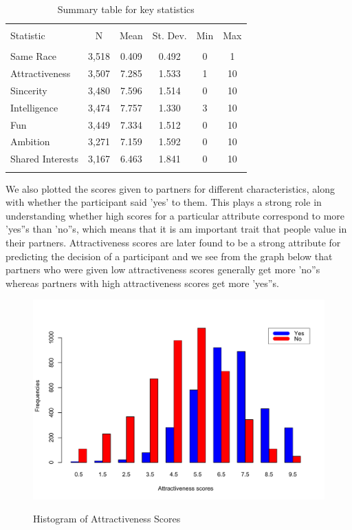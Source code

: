 \documentclass{article}
\begin{document}
\begin{table}[!htbp] \centering 
  \caption{Summary table for key statistics} 
  \label{fig:sum_table} 
\begin{tabular}{@{\extracolsep{5pt}}lccccc} 
\\[-1.8ex]\hline 
\hline \\[-1.8ex] 
Statistic & \multicolumn{1}{c}{N} & \multicolumn{1}{c}{Mean} & \multicolumn{1}{c}{St. Dev.} & \multicolumn{1}{c}{Min} & \multicolumn{1}{c}{Max} \\ 
\hline \\[-1.8ex] 
Same Race & 3,518 & 0.409 & 0.492 & 0 & 1 \\ 
Attractiveness & 3,507 & 7.285 & 1.533 & 1 & 10 \\ 
Sincerity & 3,480 & 7.596 & 1.514 & 0 & 10 \\ 
Intelligence & 3,474 & 7.757 & 1.330 & 3 & 10 \\ 
Fun & 3,449 & 7.334 & 1.512 & 0 & 10 \\ 
Ambition & 3,271 & 7.159 & 1.592 & 0 & 10 \\ 
Shared Interests & 3,167 & 6.463 & 1.841 & 0 & 10 \\ 
\hline \\[-1.8ex] 
\end{tabular} 
\end{table} 
%
We also plotted the scores given to partners for different characteristics, along with whether the participant said 'yes' to them. This plays a strong role in understanding whether high scores for a particular attribute correspond to more 'yes''s than 'no''s, which means that it is am important trait that people value in their partners. Attractiveness scores are later found to be a strong attribute for predicting the decision of a participant and we see from the graph below that partners who were given low attractiveness scores generally get more 'no''s whereas partners with high attractiveness scores get more 'yes''s.\\
\begin{figure}[H]
	\caption{Histogram of Attractiveness Scores}
	\includegraphics[scale=0.50]{AttractivenessScores}
	\centering
	\label{fig:attractiveness}
\end{figure}
\end{document}

